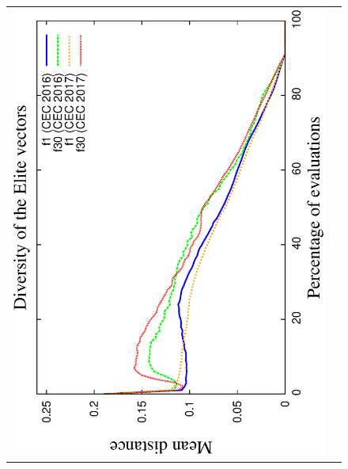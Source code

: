 \begin{figure}[t]
\centering
\begin{tabular}{cc}
   \includegraphics[scale=0.23, angle=-90]{Diversity_Elite.eps} 

\end{tabular}
\end{figure}
